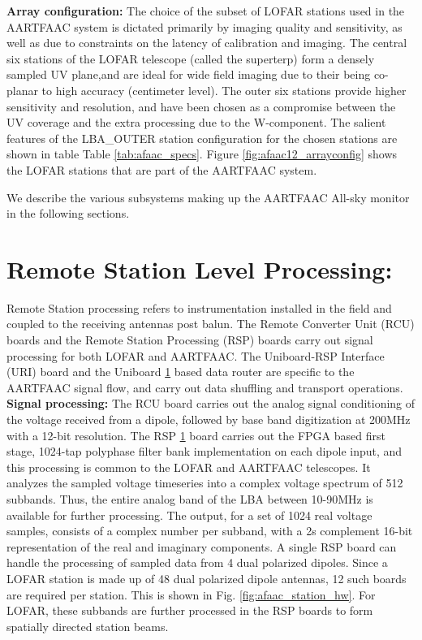 \documentclass{ws-jai}
\begin{document}
\noindent \textbf {Array configuration:}
The  choice of  the subset  of LOFAR  stations used  in the  AARTFAAC system  is
dictated  primarily by  imaging  quality  and sensitivity,  as  well  as due  to
constraints on the latency of calibration  and imaging. The central six stations
of  the  LOFAR telescope  (called  the  superterp)  form  a densely  sampled  UV
plane,and are ideal for wide field imaging  due to their being co-planar to high
accuracy (centimeter level).  The outer  six stations provide higher sensitivity
and resolution, and have been chosen as a compromise between the UV coverage and
the  extra processing  due  to the  W-component.  The  salient  features of  the
LBA\_OUTER  station configuration  for the  chosen stations  are shown  in table
Table  \ref{tab:afaac_specs}.   Figure \ref{fig:afaac12_arrayconfig}  shows  the
LOFAR stations that are part of the AARTFAAC system.

We describe the various subsystems making up the AARTFAAC All-sky monitor in the
following sections.

\section {\label{sec:station_hardware} Remote Station Level Processing:} 
Remote Station processing  refers to instrumentation installed in  the field and
coupled to  the receiving antennas post  balun. The Remote Converter  Unit (RCU)
boards  and  the  Remote  Station  Processing  (RSP)  boards  carry  out  signal
processing for both  LOFAR and AARTFAAC. The Uniboard-RSP  Interface (URI) board
and the  Uniboard \ref{} based data  router are specific to  the AARTFAAC signal
flow, and carry out data shuffling and transport operations.\\

\noindent  \textbf {Signal  processing:} The  RCU board  carries out  the analog
signal conditioning of the voltage received from a dipole, followed by base band
digitization at  200MHz with a 12-bit  resolution. The RSP \ref{}  board carries
out the FPGA based first stage, 1024-tap polyphase filter bank implementation on
each  dipole input,  and this  processing is  common to  the LOFAR  and AARTFAAC
telescopes. It  analyzes the sampled  voltage timeseries into a  complex voltage
spectrum  of 512  subbands. Thus,  the  entire analog  band of  the LBA  between
10-90MHz is available for further processing. The output, for a set of 1024 real
voltage samples, consists of a complex  number per subband, with a 2s complement
16-bit representation of  the real and imaginary components. A  single RSP board
can handle the processing of sampled  data from 4 dual polarized dipoles.  Since
a LOFAR station is made up of  48 dual polarized dipole antennas, 12 such boards
are required per station.  This is shown in Fig. \ref{fig:afaac_station_hw}. For
LOFAR, these subbands are further processed  in the RSP boards to form spatially
directed station beams.\\
\end{document}
